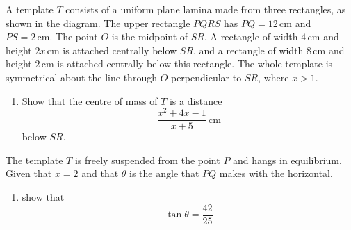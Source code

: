 \documentclass[leqno]{article}
\begin{document}
\begin{enumerate}[
  label=\textbf{\arabic*.},
  leftmargin=*,
  topsep=0pt,
  partopsep=0pt,
  parsep=0pt
]
A template $T$ consists of a uniform plane lamina made from three rectangles, as shown in the diagram. The upper rectangle $PQRS$ has $PQ=12\,\mathrm{cm}$ and $PS=2\,\mathrm{cm}$. The point $O$ is the midpoint of $SR$. A rectangle of width $4\,\mathrm{cm}$ and height $2x\,\mathrm{cm}$ is attached centrally below $SR$, and a rectangle of width $8\,\mathrm{cm}$ and height $2\,\mathrm{cm}$ is attached centrally below this rectangle. The whole template is symmetrical about the line through $O$ perpendicular to $SR$, where $x>1$. \\
\begin{enumerate}[label=\textbf{(\alph*)}]
  \item Show that the centre of mass of $T$ is a distance
  \[
  \dfrac{x^2+4x-1}{x+5}\,\mathrm{cm}
  \]
  below $SR$.  \\
\end{enumerate}
The template $T$ is freely suspended from the point $P$ and hangs in equilibrium. \\

Given that $x=2$ and that $\theta$ is the angle that $PQ$ makes with the horizontal, \\
\begin{enumerate}[label=\textbf{(\alph*)}, resume]
  \item show that
  \[
  \tan\theta=\dfrac{42}{25}
  \]
\end{enumerate}

\newpage

\questionitem

\begin{figure}[H]
    \centering
{}
\end{figure}
\end{enumerate}
\end{document}
